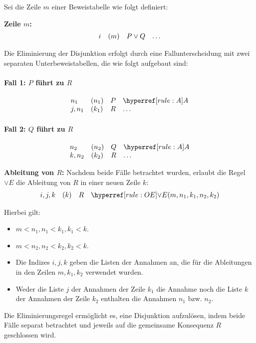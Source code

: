 \documentclass[main.tex]{subfiles}
\begin{document}
\begin{definition}
Sei die Zeile \(m\) einer Beweistabelle wie folgt definiert:

\textbf{Zeile \(m\):}
\[
\begin{array}{l l l l}
    i & (m) & P \lor Q & \dots \\
\end{array}
\]

Die Eliminierung der Disjunktion erfolgt durch eine Fallunterscheidung mit zwei separaten Unterbeweistabellen, die wie folgt aufgebaut sind:

\paragraph{Fall 1: \(P\) führt zu \(R\)}
\[
\begin{array}{l l l l}
    n_1 & (n_1) & P & \rA \\
    j,n_1 & (k_1) & R & \dots \\
\end{array}
\]

\paragraph{Fall 2: \(Q\) führt zu \(R\)}
\[
\begin{array}{l l l l}
    n_2 & (n_2) & Q & \rA \\
    k,n_2 & (k_2) & R & \dots \\
\end{array}
\]

\textbf{Ableitung von \(R\):}
Nachdem beide Fälle betrachtet wurden, erlaubt die Regel \(\lor E\) die Ableitung von \(R\) in einer neuen Zeile \(k\):
\[
\begin{array}{l l l l}
    i,j,k & (k) & R & \rOE{m,n_1,k_1,n_2,k_2} \\
\end{array}
\]

Hierbei gilt:
\begin{itemize}
    \item \(m < n_1, n_1 < k_1, k_1 < k\).
    \item \(m < n_2, n_2 < k_2, k_2 < k\).
    \item Die Indizes \(i, j, k\) geben die Listen der Annahmen an, die für die Ableitungen in den Zeilen \(m, k_1, k_2\) verwendet wurden.
    \item Weder die Liste \(j\) der Annahmen der Zeile \(k_1\) die Annahme noch die Liste \(k\) der Annahmen der Zeile \(k_2\) enthalten die Annahmen \(n_1\) bzw. \(n_2\).
\end{itemize}

Die Eliminierungsregel ermöglicht es, eine Disjunktion aufzulösen, indem beide Fälle separat betrachtet und jeweils auf die gemeinsame Konsequenz \(R\) geschlossen wird.
\end{definition}
\end{document}
